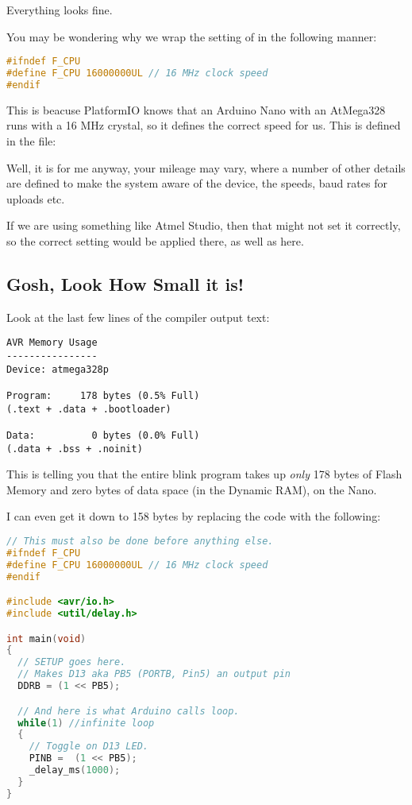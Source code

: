 Everything looks fine.

You may be wondering why we wrap the setting of  in the following manner:

\begin{lstlisting}[language=C,firstnumber=2,caption={Wrapping F\_CPU in AVRBlink.c}]
#ifndef F_CPU
#define F_CPU 16000000UL // 16 MHz clock speed
#endif
\end{lstlisting}

This is beacuse PlatformIO knows that an Arduino Nano with an AtMega328 runs with a 16
MHz crystal, so it defines the correct speed for us. This is defined in the file:


Well, it is for me anyway, your mileage may vary, where a number of other details are defined
to make the system aware of the device, the speeds, baud rates for uploads etc.

If we are using something like Atmel Studio, then that might not set it correctly, so the correct setting would be applied there, as well as here.

\subsection{Gosh, Look How Small it
is!}\label{gosh-look-how-small-it-is}

Look at the last few lines of the compiler output text:

\begin{lstlisting}[firstnumber=14]
AVR Memory Usage
----------------
Device: atmega328p

Program:     178 bytes (0.5% Full)
(.text + .data + .bootloader)

Data:          0 bytes (0.0% Full)
(.data + .bss + .noinit)
\end{lstlisting}

This is telling you that the entire blink program takes up \emph{only}
178 bytes of Flash Memory and zero bytes of data space (in the Dynamic
RAM), on the Nano. 

I can even get it down to 158 bytes by replacing the code with the following:

\begin{lstlisting}[language=C,caption={AVRBlinkSmall.c}]
// This must also be done before anything else.
#ifndef F_CPU
#define F_CPU 16000000UL // 16 MHz clock speed
#endif

#include <avr/io.h>
#include <util/delay.h>

int main(void)
{
  // SETUP goes here.
  // Makes D13 aka PB5 (PORTB, Pin5) an output pin
  DDRB = (1 << PB5); 

  // And here is what Arduino calls loop.
  while(1) //infinite loop
  {
    // Toggle on D13 LED.
    PINB =  (1 << PB5);
    _delay_ms(1000);
  }
}
\end{lstlisting}

